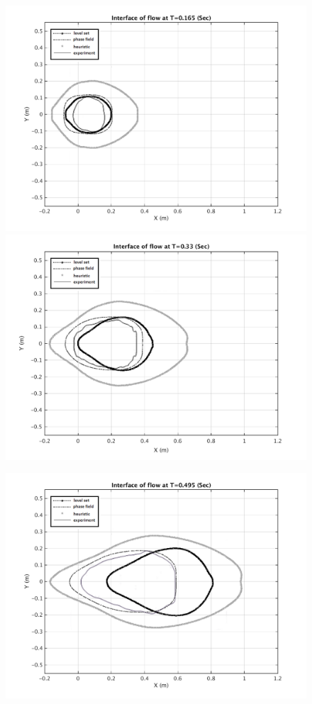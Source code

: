 \documentclass[letterpaper,10pt]{article}
\begin{document}
\begin{figure}[H]
	\begin{minipage}[b]{.48\linewidth}
		\centering
		\includegraphics[width=1\textwidth]{IMAGES/interface165exp.png}
		\includegraphics[width=1\textwidth]{IMAGES/interface330exp.png}
	\end{minipage}
	\begin{minipage}[b]{.48 \linewidth}
		\centering
		\includegraphics[width=1\textwidth]{IMAGES/interface495exp.png}

\end{minipage}
\end{figure}
\end{document}
